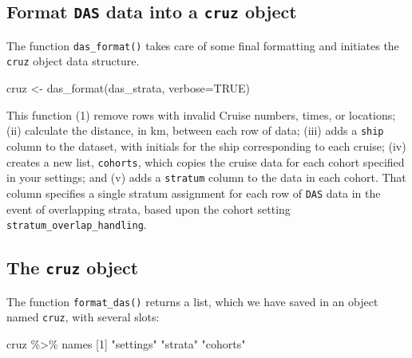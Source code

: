 \documentclass[
]{book}
\newenvironment{Shaded}{\begin{snugshade}}{\end{snugshade}}
\newcommand{\AttributeTok}[1]{\textcolor[rgb]{0.77,0.63,0.00}{#1}}
\newcommand{\ConstantTok}[1]{\textcolor[rgb]{0.00,0.00,0.00}{#1}}
\newcommand{\DecValTok}[1]{\textcolor[rgb]{0.00,0.00,0.81}{#1}}
\newcommand{\FunctionTok}[1]{\textcolor[rgb]{0.00,0.00,0.00}{#1}}
\newcommand{\NormalTok}[1]{#1}
\newcommand{\OtherTok}[1]{\textcolor[rgb]{0.56,0.35,0.01}{#1}}
\newcommand{\SpecialCharTok}[1]{\textcolor[rgb]{0.00,0.00,0.00}{#1}}
\newcommand{\StringTok}[1]{\textcolor[rgb]{0.31,0.60,0.02}{#1}}
\begin{document}
\hypertarget{format-das-data-into-a-cruz-object}{%
\subsection*{\texorpdfstring{Format \texttt{DAS} data into a \texttt{cruz} object}{Format DAS data into a cruz object}}\label{format-das-data-into-a-cruz-object}}

The function \texttt{das\_format()} takes care of some final formatting and initiates the \texttt{cruz} object data structure.

\begin{Shaded}
\begin{Highlighting}[]
\NormalTok{cruz }\OtherTok{\textless{}{-}} \FunctionTok{das\_format}\NormalTok{(das\_strata, }\AttributeTok{verbose=}\ConstantTok{TRUE}\NormalTok{)}
\end{Highlighting}
\end{Shaded}

This function (1) remove rows with invalid Cruise numbers, times, or locations; (ii) calculate the distance, in km, between each row of data; (iii) adds a \texttt{ship} column to the dataset, with initials for the ship corresponding to each cruise; (iv) creates a new list, \texttt{cohorts}, which copies the cruise data for each cohort specified in your settings; and (v) adds a \texttt{stratum} column to the data in each cohort. That column specifies
a single stratum assignment for each row of \texttt{DAS} data in the event of overlapping strata, based upon the cohort setting \texttt{stratum\_overlap\_handling}.

\hypertarget{the-cruz-object}{%
\subsection*{\texorpdfstring{The \texttt{cruz} object}{The cruz object}}\label{the-cruz-object}}

The function \texttt{format\_das()} returns a list, which we have saved in an object named \texttt{cruz}, with several slots:

\begin{Shaded}
\begin{Highlighting}[]
\NormalTok{cruz }\SpecialCharTok{\%\textgreater{}\%}\NormalTok{ names}
\NormalTok{[}\DecValTok{1}\NormalTok{] }\StringTok{"settings"} \StringTok{"strata"}   \StringTok{"cohorts"} 
\end{Highlighting}
\end{Shaded}
\end{document}

